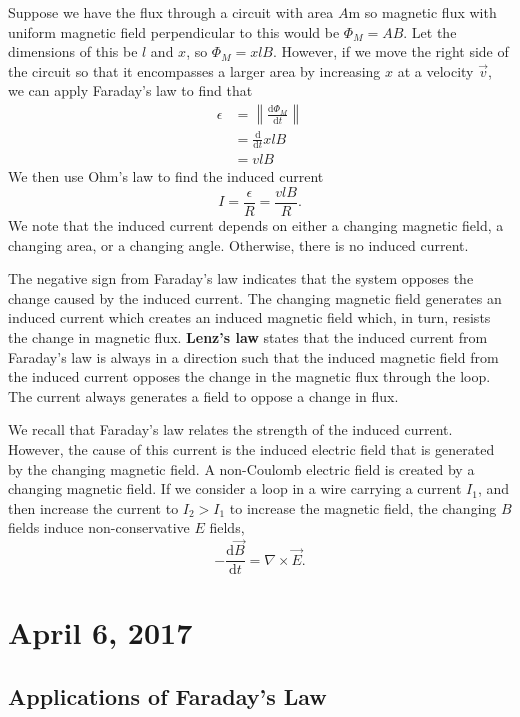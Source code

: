 \documentclass[11pt]{article}
\theoremstyle{plain} %
\theoremstyle{definition}
\theoremstyle{example}
\theoremstyle{remark}
\begin{document}
Suppose we have the flux through a circuit with area $A$m so magnetic flux with uniform magnetic field perpendicular to this would be $\Phi_M = AB$. Let the dimensions of this be $l$ and $x$, so $\Phi_M = xlB$. However, if we move the right side of the circuit so that it encompasses a larger area by increasing $x$ at a velocity $\vec{v}$, we can apply Faraday's law to find that 
\begin{align*}
	\epsilon &= \left\|\frac{\mathrm d \Phi_M}{\mathrm d t}\right\|\\
	&= \frac{\mathrm d}{\mathrm d t}xlB\\
	&= vlB
\end{align*}
We then use Ohm's law to find the induced current
$$I = \frac{\epsilon}{R} = \frac{vlB}{R}.$$
We note that the induced current depends on either a changing magnetic field, a changing area, or a changing angle. Otherwise, there is no induced current. 

The negative sign from Faraday's law indicates that the system opposes the change caused by the induced current. The changing magnetic field generates an induced current which creates an induced magnetic field which, in turn, resists the change in magnetic flux. \textbf{Lenz's law} states that the induced current from Faraday's law is always in a direction such that the induced magnetic field from the induced current opposes the change in the magnetic flux through the loop. The current always generates a field to oppose a change in flux. 

We recall that Faraday's law relates the strength of the induced current. However, the cause of this current is the induced electric field that is generated by the changing magnetic field. A non-Coulomb electric field is created by a changing magnetic field. If we consider a loop in a wire carrying a current $I_1$, and then increase the current to $I_2>I_1$ to increase the magnetic field, the changing $B$ fields induce non-conservative $E$ fields, 
$$-\frac{\mathrm d \vec{B}}{\mathrm d t} = \nabla \times \vec{E}.$$

\section{April 6, 2017}
\subsection{Applications of Faraday's Law}
\end{document}
